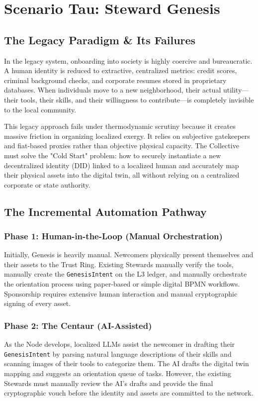 \chapter{Scenario Tau: Steward Genesis}
\label{ch:scenario_tau}

\section{The Legacy Paradigm \& Its Failures}
In the legacy system, onboarding into society is highly coercive and bureaucratic. A human identity is reduced to extractive, centralized metrics: credit scores, criminal background checks, and corporate resumes stored in proprietary databases. When individuals move to a new neighborhood, their actual utility—their tools, their skills, and their willingness to contribute—is completely invisible to the local community.

This legacy approach fails under thermodynamic scrutiny because it creates massive friction in organizing localized exergy. It relies on subjective gatekeepers and fiat-based proxies rather than objective physical capacity. The Collective must solve the "Cold Start" problem: how to securely instantiate a new decentralized identity (DID) linked to a localized human and accurately map their physical assets into the digital twin, all without relying on a centralized corporate or state authority.

\section{The Incremental Automation Pathway}

\subsection{Phase 1: Human-in-the-Loop (Manual Orchestration)}
Initially, Genesis is heavily manual. Newcomers physically present themselves and their assets to the Trust Ring. Existing Stewards manually verify the tools, manually create the \texttt{GenesisIntent} on the L3 ledger, and manually orchestrate the orientation process using paper-based or simple digital BPMN workflows. Sponsorship requires extensive human interaction and manual cryptographic signing of every asset.

\subsection{Phase 2: The Centaur (AI-Assisted)}
As the Node develops, localized LLMs assist the newcomer in drafting their \texttt{GenesisIntent} by parsing natural language descriptions of their skills and scanning images of their tools to categorize them. The AI drafts the digital twin mapping and suggests an orientation queue of tasks. However, the existing Stewards must manually review the AI's drafts and provide the final cryptographic vouch before the identity and assets are committed to the network.

